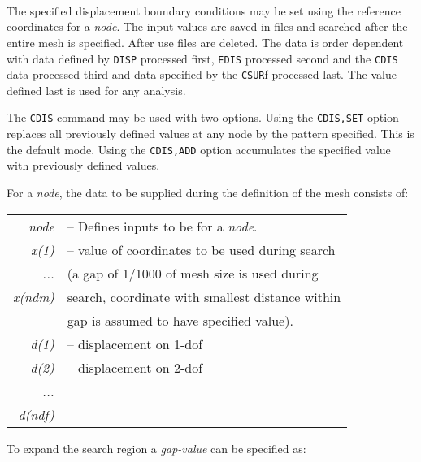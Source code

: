  \\{\smallskip}
 \\{\smallskip}
 \\{\smallskip}
\headb

The specified displacement boundary conditions may be set
using the reference coordinates for a {\it node}.  The input values are
saved in files and searched after the entire mesh is
specified.  After use files are deleted.
The data is order dependent with data
defined by {\tt DISP} processed first, {\tt EDIS} processed second and
the {\tt CDIS} data processed third and data specified by the {\tt CSUR}f
processed last.  The value defined last is used for any analysis.

The {\tt CDIS} command may be used with two options.  Using the {\tt CDIS,SET}
option replaces all previously defined values at any node by the
pattern specified. This is the default mode.  Using the {\tt CDIS,ADD} option
accumulates the specified value with previously defined values.

For a {\it node}, the data to be supplied during
the definition of the mesh consists of:

\begin{center}
\begin{tabular}{r l}
\it node   &-- Defines inputs to be for a {\it node}. \\
\it x(1)   &-- value of coordinates to be used during search \\
\it ...    &\quad (a gap of 1/1000 of mesh size is used during \\
\it x(ndm) &\quad search, coordinate with smallest distance within \\
           &\quad gap is assumed to have specified value). \\
\it d(1)   &-- displacement on 1-dof \\
\it d(2)   &-- displacement on 2-dof \\
\it ...    & \\
\it d(ndf) &
\end{tabular}
\end{center}
To expand the search region a {\it gap-value} can be specified as:


